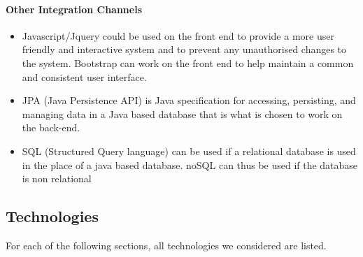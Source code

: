 \documentclass{article}
\begin{document}
			\paragraph{Other Integration Channels}
				\begin{itemize}
           			\item Javascript/Jquery could be used on the front end to provide a more user friendly and interactive system and to prevent any unauthorised changes to the system. Bootstrap can work on the front end to help maintain a common and consistent user interface.
			         \item JPA (Java Persistence API) is Java specification for accessing, persisting, and managing data in a Java based database that  is what is chosen to work on the back-end. 
			          \item SQL (Structured Query language) can be used if a relational database is used in the place of a java based database. noSQL can thus be used if the database is non relational
				\end{itemize}
	\subsection{Technologies}

	For each of the following sections, all technologies we considered are listed.
	
\end{document}

